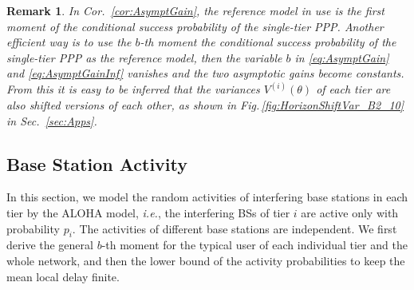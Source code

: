 \documentclass[12pt,draftclsnofoot,journal,onecolumn]{IEEEtran}
\def\figref#1{Fig.\,\ref{#1}}%
\def\ie{{\em i.e.}}
\newtheorem{remark}{Remark}
\begin{document}
\begin{remark}
	In Cor.~\ref{cor:AsymptGain}, the reference model in use is the first moment of the conditional success probability of the single-tier PPP. Another efficient way is to use the $b$-th moment the conditional success probability of the single-tier PPP as the reference model, then the variable $b$ in \eqref{eq:AsymptGain} and \eqref{eq:AsymptGainInf} vanishes and the two asymptotic gains become constants. From this it is easy to be inferred that the variances $V^{(i)}(\theta)$ of each tier are also shifted versions of each other, as shown in \figref{fig:HorizonShiftVar_B2_10} in Sec.~\ref{sec:Apps}. 
\end{remark} 

\subsection{Base Station Activity}\label{sec:BSactivity} 
In this section, we model the random activities of interfering base stations in each tier by the ALOHA model, \ie, the interfering BSs of tier $i$ are active only with probability $p_i$. The activities of different base stations are independent. We first derive the general $b$-th moment for the typical user of each individual tier and the whole network, and then the lower bound of the activity probabilities to keep the mean local delay finite.  
\end{document}
